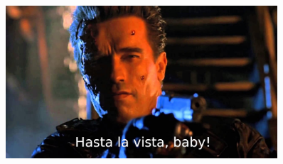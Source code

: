 \documentclass[12pt,mathserif,aspectratio=169]{beamer}
\begin{document}
\begin{frame}
    \begin{figure}
        \includegraphics[width=0.9\textwidth]{fig/hastalavistababy.jpg}
    \end{figure}
\end{frame}
\end{document}
